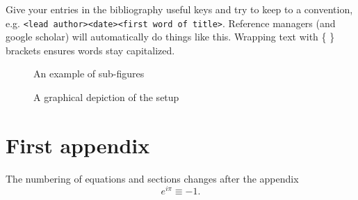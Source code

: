 \documentclass[
 reprint, %
 amsmath, amssymb, aps, %
 a4paper,
]{revtex4-2}
\begin{document}
Give your entries in the bibliography useful keys and try to keep to a convention, e.g. \texttt{<lead author><date><first word of title>}.
Reference managers (and google scholar) will automatically do things like this. Wrapping text with \{ \} brackets ensures words stay capitalized.


\begin{figure} %
    \centering
    \hfill
    \caption{An example of sub-figures}
    \label{fig:doublefig}
\end{figure}

\begin{figure}
    \centering
    \hfil
    \caption{A graphical depiction of the setup}
    \label{fig:subfigureExample}
\end{figure}



\appendix

\section{First appendix}
The numbering of equations and sections changes after the appendix
\begin{equation}
    e^{i\pi}\equiv-1.
\end{equation}
\end{document}
